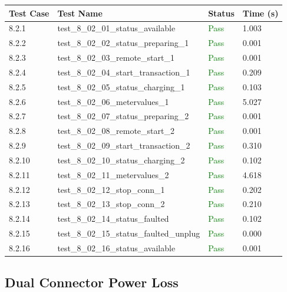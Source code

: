 \documentclass{article}
\begin{document}
\begin{longtable}{p{} p{} p{} p{}}
\toprule
\textbf{Test Case} & \textbf{Test Name} & \textbf{Status} & \textbf{Time (s)} \\
\midrule
\endhead
8.2.1 & test\_8\_02\_01\_status\_available & \textcolor{green}{Pass} & 1.003 \\
8.2.2 & test\_8\_02\_02\_status\_preparing\_1 & \textcolor{green}{Pass} & 0.001 \\
8.2.3 & test\_8\_02\_03\_remote\_start\_1 & \textcolor{green}{Pass} & 0.001 \\
8.2.4 & test\_8\_02\_04\_start\_transaction\_1 & \textcolor{green}{Pass} & 0.209 \\
8.2.5 & test\_8\_02\_05\_status\_charging\_1 & \textcolor{green}{Pass} & 0.103 \\
8.2.6 & test\_8\_02\_06\_metervalues\_1 & \textcolor{green}{Pass} & 5.027 \\
8.2.7 & test\_8\_02\_07\_status\_preparing\_2 & \textcolor{green}{Pass} & 0.001 \\
8.2.8 & test\_8\_02\_08\_remote\_start\_2 & \textcolor{green}{Pass} & 0.001 \\
8.2.9 & test\_8\_02\_09\_start\_transaction\_2 & \textcolor{green}{Pass} & 0.310 \\
8.2.10 & test\_8\_02\_10\_status\_charging\_2 & \textcolor{green}{Pass} & 0.102 \\
8.2.11 & test\_8\_02\_11\_metervalues\_2 & \textcolor{green}{Pass} & 4.618 \\
8.2.12 & test\_8\_02\_12\_stop\_conn\_1 & \textcolor{green}{Pass} & 0.202 \\
8.2.13 & test\_8\_02\_13\_stop\_conn\_2 & \textcolor{green}{Pass} & 0.210 \\
8.2.14 & test\_8\_02\_14\_status\_faulted & \textcolor{green}{Pass} & 0.102 \\
8.2.15 & test\_8\_02\_15\_status\_faulted\_unplug & \textcolor{green}{Pass} & 0.000 \\
8.2.16 & test\_8\_02\_16\_status\_available & \textcolor{green}{Pass} & 0.001 \\
\bottomrule
\end{longtable}
\subsection{Dual Connector Power Loss}
\end{document}

